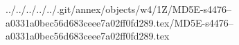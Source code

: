 ../../../../../.git/annex/objects/w4/1Z/MD5E-s4476--a0331a0bec56d683ceee7a02ff0fd289.tex/MD5E-s4476--a0331a0bec56d683ceee7a02ff0fd289.tex